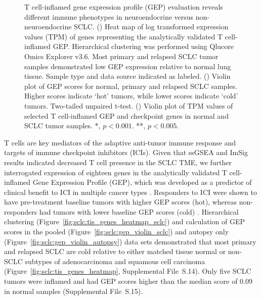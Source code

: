\begin{figure}[htb]
    \vspace{-0.5cm}
    \caption[GEP evaluation reveals different immune phenotypes in neuroendocrine vs.\ non-neuroendocrine SCLC.]{T cell-inflamed gene expression profile (GEP) evaluation reveals different immune phenotypes in neuroendocrine versus non-neuroendocrine SCLC\@. () Heat map of log transformed expression values (TPM) of genes representing the analytically validated T cell-inflamed GEP\@. Hierarchical clustering was performed using Qlucore Omics Explorer v3.6. Most primary and relapsed SCLC tumor samples demonstrated low GEP expression relative to normal lung tissue. Sample type and data source indicated as labeled. () Violin plot of GEP scores for normal, primary and relapsed SCLC samples. Higher scores indicate `hot' tumors, while lower scores indicate `cold' tumors. Two-tailed unpaired t-test. () Violin plot of TPM values of selected T cell-inflamed GEP and checkpoint genes in normal and SCLC tumor samples. *, $p<0.001$. **, $p<0.005$.}
    \label{fig:sclc:immune_profiles}
\end{figure}
T cells are key mediators of the adaptive anti-tumor immune response and targets of immune checkpoint inhibitors (ICIs). Given that ssGSEA and ImSig results indicated decreased T cell presence in the SCLC TME, we further interrogated expression of eighteen genes in the analytically validated T cell-inflamed Gene Expression Profile (GEP), which was developed as a predictor of clinical benefit to ICI in multiple cancer types \cite{ayers2017}. Responders to ICI were shown to have pre-treatment baseline tumors with higher GEP scores (hot), whereas non-responders had tumors with lower baseline GEP scores (cold) \cite{cristescu2018,ayers2017}. Hierarchical clustering (Figure~\ref{fig:sclc:tis_genes_heatmap_sclc}) and calculation of GEP scores in the pooled (Figure~\ref{fig:sclc:gep_violin_sclc}) and autopsy only (Figure~\ref{fig:sclc:gep_violin_autopsy}) data sets demonstrated that most primary and relapsed SCLC are cold relative to either matched tissue normal or non-SCLC subtypes of adenocarcinoma and squamous cell carcinoma (Figure~\ref{fig:sclc:tis_genes_heatmap}, Supplemental File~S\thechapter{}.14). Only five SCLC tumors were inflamed and had GEP scores higher than the median score of \textapprox{}0.09 in normal samples (Supplemental File~S\thechapter{}.15).

